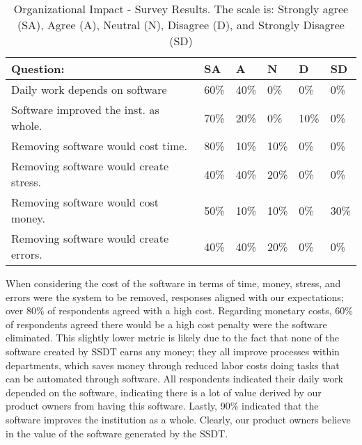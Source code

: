 
\begin{table}
\caption{Organizational Impact - Survey Results. The scale is: Strongly agree (SA), Agree (A), Neutral (N), Disagree (D), and Strongly Disagree (SD)}
\label{table:orgImpact}
\begin{tabular}{p{4.3cm}p{.4cm}p{.4cm}p{.4cm}p{.4cm}p{.4cm}}
Question: & SA & A & N & D & SD \\
\hline
Daily work depends on software & 60\% & 40\% & 0\% & 0\% & 0\% \\
Software improved the inst. as whole. & 70\% & 20\% & 0\% & 10\% & 0\% \\
Removing software would cost time. & 80\% & 10\% & 10\% & 0\% & 0\% \\
Removing software would create stress. & 40\% & 40\% & 20\% & 0\% & 0\% \\
Removing software would cost money. & 50\% & 10\% & 10\% & 0\% & 30\% \\
Removing software would create errors. & 40\% & 40\% & 20\% & 0\% & 0\% \\
\end{tabular}
\end{table}

When considering the cost of the software in terms of time, money, stress, and errors were the system to be removed, responses aligned with our expectations; over 80\% of respondents agreed with a high cost. Regarding monetary costs, 60\% of respondents agreed there would be a high cost penalty were the software eliminated. This slightly lower metric is likely due to the fact that none of the software created by SSDT earns any money; they all improve processes within departments, which saves money through reduced labor costs doing tasks that can be automated through software. All respondents indicated their daily work depended on the software, indicating there is a lot of value derived by our product owners from having this software. Lastly, 90\% indicated that the software improves the institution as a whole. Clearly, our product owners believe in the value of the software generated by the SSDT.
